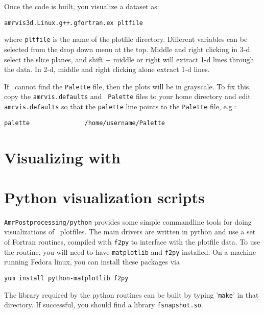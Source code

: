 Once the code is built, you visualize a dataset as:
\begin{verbatim}
amrvis3d.Linux.g++.gfortran.ex pltfile
\end{verbatim}
where {\tt pltfile} is the name of the plotfile directory.  Different
variables can be selected from the drop down menu at the top.  Middle
and right clicking in 3-d select the slice planes, and shift + middle
or right will extract 1-d lines through the data.  In 2-d, middle and
right clicking alone extract 1-d lines.

If \amrvis\ cannot find the {\tt Palette} file, then the plots will be
in grayscale.  To fix this, copy the {\tt amrvis.defaults} and {\tt
  Palette} files to your home directory and edit {\tt amrvis.defaults} so that
the {\tt palette} line points to the {\tt Palette} file, e.g.:
\begin{verbatim}
palette               /home/username/Palette
\end{verbatim}


\section{Visualizing with \visit}



\section{Python visualization scripts}
\label{sec:vis:python}


{\tt AmrPostprocessing/python} provides some simple commandline
tools for doing visualizations of \boxlib\ plotfiles.  The main drivers
are written in python and use a set of Fortran routines, compiled with
{\tt f2py} to interface with the plotfile data.  To use the routine,
you will need to have {\tt matplotlib} and {\tt f2py} installed.  On a
machine running Fedora linux, you can install these packages via
\begin{verbatim}   
yum install python-matplotlib f2py
\end{verbatim}
%
The library required by the python routines can be built by typing
'{\tt make}' in that directory.  If successful, you should find
a library {\tt fsnapshot.so}. 

